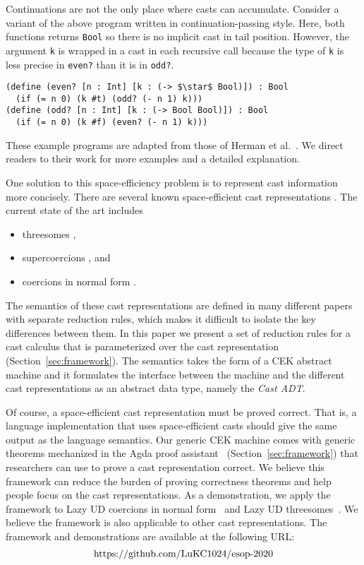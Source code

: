 \documentclass[runningheads]{llncs}
\newcommand{\urlFrameworkAndIllustration}{
	\url{https://github.com/LuKC1024/esop-2020}
}
\begin{document}
Continuations are not the only place where casts can accumulate.
Consider a variant of the above program written in
continuation-passing style.  Here, both functions returns
\lstinline|Bool| so there is no implicit cast in tail position.
However, the argument \lstinline|k| is wrapped in a cast in each
recursive call because the type of \lstinline|k| is less precise in
\lstinline|even?| than it is in \lstinline|odd?|.
\begin{lstlisting}
(define (even? [n : Int] [k : (-> $\star$ Bool)]) : Bool
  (if (= n 0) (k #t) (odd? (- n 1) k)))
(define (odd? [n : Int] [k : (-> Bool Bool)]) : Bool
  (if (= n 0) (k #f) (even? (- n 1) k)))
\end{lstlisting}
These example programs are adapted from those of Herman et al.~\citep{herman2010space}.
We direct readers to their work for more examples and a detailed explanation.

One solution to this space-efficiency problem is to represent cast
information more concisely. There are several known space-efficient
cast representations
\citep{Siek:2015:BCT:2737924.2737968,Siek:2010:TWB:1706299.1706342,Garcia:2013:CTB:2500365.2500603,kuhlenschmidt2018efficient,siek2012interpretations,garcia2014deriving}.
The current state of the art includes
\begin{itemize}
	\item threesomes 
	\citep{Siek:2010:TWB:1706299.1706342,Garcia:2013:CTB:2500365.2500603},
	\item supercoercions \citep{Garcia:2013:CTB:2500365.2500603}, and
	\item coercions in normal form
	\citep{siek2012interpretations,Siek:2015:BCT:2737924.2737968}.
\end{itemize}

The semantics of these cast representations are defined in many
different papers with separate reduction rules, which makes it
difficult to isolate the key differences between them.  In this paper
we present a set of reduction rules for a cast calculus that
is parameterized over the cast representation
(Section~\ref{sec:framework}).
The semantics takes the form of a CEK
abstract machine and it formulates the interface between the machine
and the different cast representations as an abstract data type,
namely the \emph{Cast ADT}.

Of course, a space-efficient cast representation must be proved
correct. That is, a language implementation that uses space-efficient
casts should give the same output as the language semantics. Our
generic CEK machine comes with generic theorems mechanized in
the Agda proof assistant~\citep{norell2008dependently}
(Section~\ref{sec:framework}) that researchers can use to prove a cast
representation correct.  We believe this framework can reduce the
burden of proving correctness theorems and help people focus on the
cast representations. As a demonstration, we apply the framework to
Lazy UD coercions in normal form~\citep{Siek:2015:BCT:2737924.2737968}
and Lazy UD threesomes~\citep{Siek:2010:TWB:1706299.1706342}. We
believe the framework is also applicable to other cast
representations. The framework and demonstrations are available at the
following URL:
\[\text{\urlFrameworkAndIllustration}\]
\end{document}
